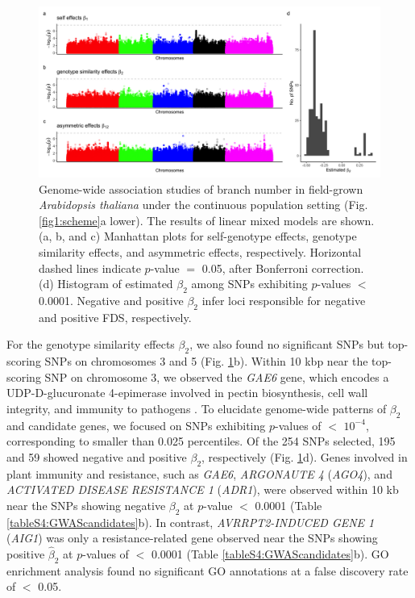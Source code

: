 \documentclass[12pt,]{article}
\begin{document}
\begin{figure}[ht]
  \includegraphics[width=\linewidth]{ManhattanLMM.png}
  \caption{Genome-wide association studies of branch number in field-grown \textit{Arabidopsis thaliana} under the continuous population setting (Fig. \ref{fig1:scheme}a lower). The results of linear mixed models are shown. (a, b, and c) Manhattan plots for self-genotype effects, genotype similarity effects, and asymmetric effects, respectively. Horizontal dashed lines indicate $p$-value $=$ 0.05, after Bonferroni correction. (d) Histogram of estimated $\beta_2$ among SNPs exhibiting $p$-values $<$ 0.0001. Negative and positive $\beta_2$ infer loci responsible for negative and positive FDS, respectively.}
  \label{fig5:gwas}
\end{figure}

For the genotype similarity effects $\beta_2$, we also found no significant SNPs but top-scoring SNPs on chromosomes 3 and 5 (Fig. \ref{fig5:gwas}b). Within 10 kbp near the top-scoring SNP on chromosome 3, we observed the \textit{GAE6} gene, which encodes a UDP-D-glucuronate 4-epimerase involved in pectin biosynthesis, cell wall integrity, and immunity to pathogens \citep{bethke2016pectin}. To elucidate genome-wide patterns of $\beta_2$ and candidate genes, we focused on SNPs exhibiting $p$-values of $<$ $10^{-4}$, corresponding to smaller than 0.025 percentiles. Of the 254 SNPs selected, 195 and 59 showed negative and positive $\beta_2$, respectively (Fig. \ref{fig5:gwas}d). Genes involved in plant immunity and resistance, such as \textit{GAE6}, \textit{ARGONAUTE 4} (\textit{AGO4}), and \textit{ACTIVATED DISEASE RESISTANCE 1} (\textit{ADR1}), were observed within 10 kb near the SNPs showing negative $\beta_2$ at $p$-value $<$ 0.0001 (Table \ref{tableS4:GWAScandidates}b). In contrast, \textit{AVRRPT2-INDUCED GENE 1} (\textit{AIG1}) was only a resistance-related gene observed near the SNPs showing positive $\hat{\beta}_2$ at $p$-values of $<$ 0.0001 (Table \ref{tableS4:GWAScandidates}b). GO enrichment analysis found no significant GO annotations at a false discovery rate of $<$ 0.05.
\end{document}
